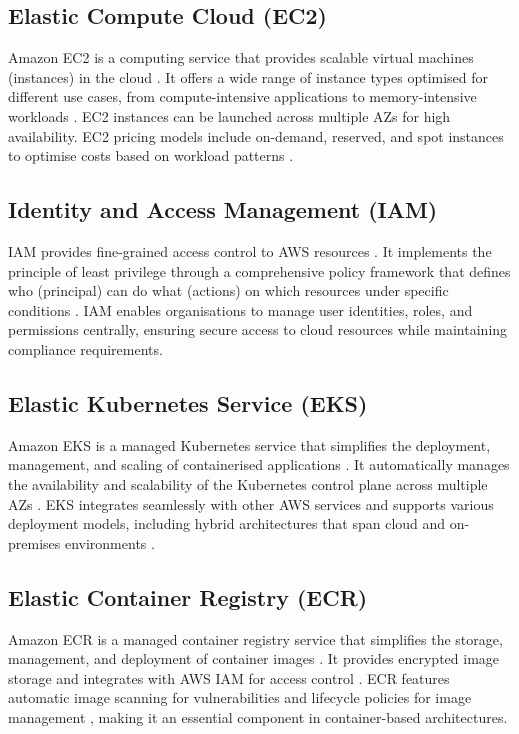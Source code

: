 \subsection{Elastic Compute Cloud (EC2)}
Amazon EC2 is a computing service that provides scalable virtual machines (instances) in the cloud \cite{ec2_definition}. It offers a wide range of instance types optimised for different use cases, from compute-intensive applications to memory-intensive workloads \cite{ec2_instance_types}. EC2 instances can be launched across multiple AZs for high availability. EC2 pricing models include on-demand, reserved, and spot instances to optimise costs based on workload patterns \cite{ec2_pricing}.

\subsection{Identity and Access Management (IAM)}
IAM provides fine-grained access control to AWS resources \cite{iam_definition}. It implements the principle of least privilege through a comprehensive policy framework that defines who (principal) can do what (actions) on which resources under specific conditions \cite{iam_security}. IAM enables organisations to manage user identities, roles, and permissions centrally, ensuring secure access to cloud resources while maintaining compliance requirements.

\subsection{Elastic Kubernetes Service (EKS)}
Amazon EKS is a managed Kubernetes service that simplifies the deployment, management, and scaling of containerised applications \cite{eks_definition}. It automatically manages the availability and scalability of the Kubernetes control plane across multiple AZs \cite{eks_definition}. EKS integrates seamlessly with other AWS services and supports various deployment models, including hybrid architectures that span cloud and on-premises environments \cite{eks_deployment}.

\subsection{Elastic Container Registry (ECR)}
Amazon ECR is a managed container registry service that simplifies the storage, management, and deployment of container images \cite{ecr_definition}. It provides encrypted image storage and integrates with AWS IAM for access control \cite{ecr_iam}. ECR features automatic image scanning for vulnerabilities \cite{ecr_image_scanning} and lifecycle policies for image management \cite{ecr_lifecycle}, making it an essential component in container-based architectures.

